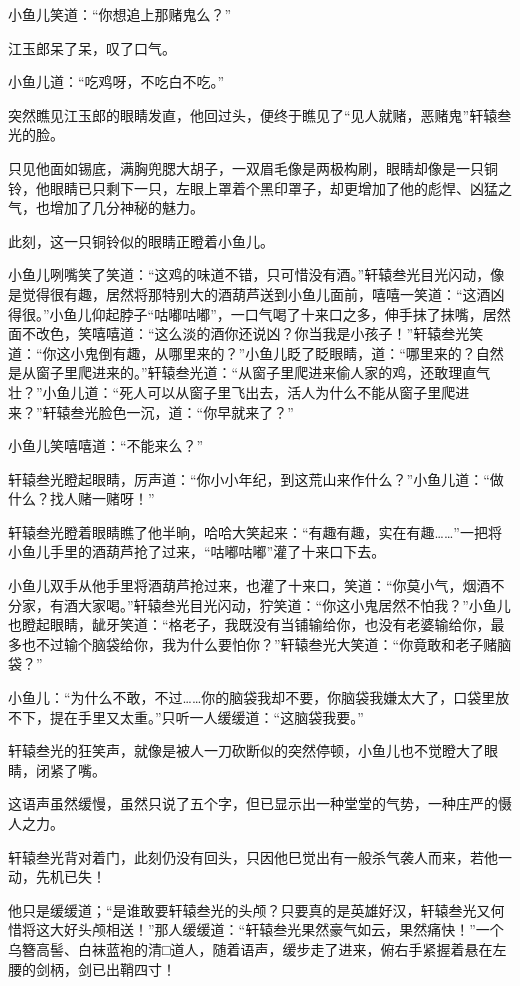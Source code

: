 \documentclass[12pt,oneside]{book}
\begin{document}
小鱼儿笑道：``你想追上那赌鬼么？''

江玉郎呆了呆，叹了口气。

小鱼儿道：``吃鸡呀，不吃白不吃。''

突然瞧见江玉郎的眼睛发直，他回过头，便终于瞧见了``见人就赌，恶赌鬼''轩辕叁光的脸。

只见他面如锡底，满胸兜腮大胡子，一双眉毛像是两极构刷，眼睛却像是一只铜铃，他眼睛已只剩下一只，左眼上罩着个黑印罩子，却更增加了他的彪悍、凶猛之气，也增加了几分神秘的魅力。

此刻，这一只铜铃似的眼睛正瞪着小鱼儿。

小鱼儿咧嘴笑了笑道：``这鸡的味道不错，只可惜没有酒。''轩辕叁光目光闪动，像是觉得很有趣，居然将那特别大的酒葫芦送到小鱼儿面前，嘻嘻一笑道：``这酒凶得很。''小鱼儿仰起脖子``咕嘟咕嘟''，一口气喝了十来口之多，伸手抹了抹嘴，居然面不改色，笑嘻嘻道：``这么淡的酒你还说凶？你当我是小孩子！''轩辕叁光笑道：``你这小鬼倒有趣，从哪里来的？''小鱼儿眨了眨眼睛，道：``哪里来的？自然是从窗子里爬进来的。''轩辕叁光道：``从窗子里爬进来偷人家的鸡，还敢理直气壮？''小鱼儿道：``死人可以从窗子里飞出去，活人为什么不能从窗子里爬进来？''轩辕叁光脸色一沉，道：``你早就来了？''

小鱼儿笑嘻嘻道：``不能来么？''

轩辕叁光瞪起眼睛，厉声道：``你小小年纪，到这荒山来作什么？''小鱼儿道：``做什么？找人赌一赌呀！''

轩辕叁光瞪着眼睛瞧了他半晌，哈哈大笑起来：``有趣有趣，实在有趣\ldots\ldots{}''一把将小鱼儿手里的酒葫芦抢了过来，``咕嘟咕嘟''灌了十来口下去。

小鱼儿双手从他手里将酒葫芦抢过来，也灌了十来口，笑道：``你莫小气，烟酒不分家，有酒大家喝。''轩辕叁光目光闪动，狞笑道：``你这小鬼居然不怕我？''小鱼儿也瞪起眼睛，龇牙笑道：``格老子，我既没有当铺输给你，也没有老婆输给你，最多也不过输个脑袋给你，我为什么要怕你？''轩辕叁光大笑道：``你竟敢和老子赌脑袋？''

小鱼儿：``为什么不敢，不过\ldots\ldots 你的脑袋我却不要，你脑袋我嫌太大了，口袋里放不下，提在手里又太重。''只听一人缓缓道：``这脑袋我要。''

轩辕叁光的狂笑声，就像是被人一刀砍断似的突然停顿，小鱼儿也不觉瞪大了眼睛，闭紧了嘴。

这语声虽然缓慢，虽然只说了五个字，但已显示出一种堂堂的气势，一种庄严的慑人之力。

轩辕叁光背对着门，此刻仍没有回头，只因他巳觉出有一般杀气袭人而来，若他一动，先机已失！

他只是缓缓道；``是谁敢要轩辕叁光的头颅？只要真的是英雄好汉，轩辕叁光又何惜将这大好头颅相送！''那人缓缓道：``轩辕叁光果然豪气如云，果然痛快！''一个乌簪高髻、白袜蓝袍的清□道人，随着语声，缓步走了进来，俯右手紧握着悬在左腰的剑柄，剑已出鞘四寸！
\end{document}
